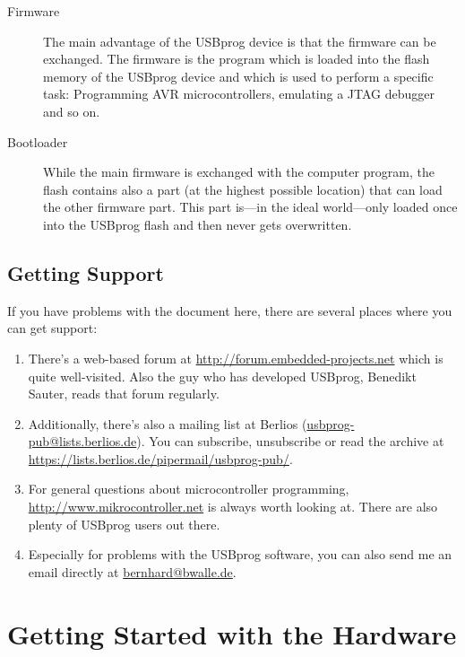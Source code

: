 \documentclass[bibtotoc,UKenglish,halfparskip,oneside,DIV12]{scrreprt}
\begin{document}
\begin{description}
  \item[Firmware] The main advantage of the USBprog device is that the firmware can be exchanged.
    The firmware is the program which is loaded into the flash memory of the USBprog device and
    which is used to perform a specific task: Programming AVR microcontrollers, emulating a JTAG
    debugger and so on.

  \item[Bootloader] While the main firmware is exchanged with the computer program, the flash
    contains also a part (at the highest possible location) that can load the other firmware part.
    This part is---in the ideal world---only loaded once into the USBprog flash and then never gets
    overwritten.
\end{description}

\section{Getting Support}

If you have problems with the document here, there are several places where you can get support:

\begin{enumerate}
  \item There's a web-based forum at \url{http://forum.embedded-projects.net} which is quite
    well-visited. Also the guy who has developed USBprog, Benedikt Sauter, reads that forum
    regularly.

  \item Additionally, there's also a mailing list at Berlios (\url{usbprog-pub@lists.berlios.de}).
    You can subscribe, unsubscribe or read the archive at
    \url{https://lists.berlios.de/pipermail/usbprog-pub/}.

  \item For general questions about microcontroller programming,
    \url{http://www.mikrocontroller.net} is always worth looking at. There are also plenty of
    USBprog users out there.

  \item Especially for problems with the USBprog software, you can also send me an email
    directly at \url{bernhard@bwalle.de}.
\end{enumerate}



\chapter{Getting Started with the Hardware}
\end{document}
